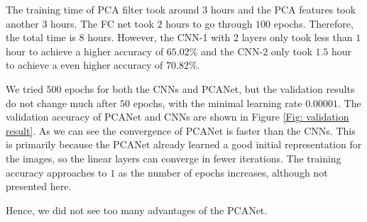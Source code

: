 \documentclass[10pt,twocolumn,letterpaper]{article}
\begin{document}
The training time of PCA filter took around $3$ hours and the PCA features took another $3$ hours. The FC net took $2$ hours to go through $100$ epochs. Therefore, the total time is $8$ hours. However, the CNN-1 with $2$ layers only took less than $1$ hour to achieve a higher accuracy of $65.02\%$ and the CNN-2 only took $1.5$ hour to achieve a even higher accuracy of $70.82\%$.

We tried $500$ epochs for both the CNNs and PCANet, but the validation results do not change much after $50$ epochs, with the minimal learning rate $0.00001$. The validation accuracy of PCANet and CNNs are shown in Figure \ref{Fig: validation result}. As we can see the convergence of PCANet is faster than the CNNs. This is primarily because the PCANet already learned a good initial representation for the images, so the linear layers can converge in fewer iterations. The training accuracy approaches to $1$ as the number of epochs increases, although not presented here. 

Hence, we did not see too many advantages of the PCANet.
\end{document}
